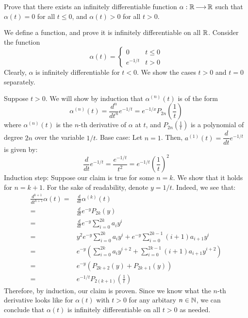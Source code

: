 \newpage
\label{q4}
\begin{qu}[num=4.1]
    Prove that there exists an infinitely differentiable function
    $ \alpha: \mathbb{R} \operatorname{\longrightarrow} \mathbb{R} $ such that $ \alpha(t) = 0 $ for all
    $ t \leq 0 $, and $ \alpha(t) > 0 $ for all $ t > 0 $.
\end{qu}

\begin{soln}
    We define a function, and prove it is infinitely differentiable on all
    $ \mathbb{R} $. Consider the function
    \begin{equation*}
        \alpha(t) = \begin{cases} 0 & t \leq 0 \\ e^{-1/t} & t > 0 \end{cases}
    \end{equation*}
    Clearly, $ \alpha $ is infinitely differentiable for $ t < 0 $.
    We show the cases $ t > 0 $ and $ t = 0 $ separately. \npgh

    Suppose $ t > 0 $. We will show by induction that $ \alpha^{(n)}(t) $ is of
    the form
    \begin{equation*}
        \alpha^{(n)}(t) = \frac{d^{n}}{dt^{n}} e^{-1/t} = e^{-1/x} P_{2n}
        \left( \frac{1}{t} \right)
    \end{equation*}
    where $ \alpha^{(n)}(t) $ is the $ n $-th derivative of $ \alpha $ at $ t $,
    and $ P_{2n}(\frac{1}{t}) $ is a polynomial of degree $ 2n $ over the
    variable $ 1/t $. \vsp
    Base case: Let $ n = 1 $.
    Then, $ a^{(1)}(t) = \dfrac{d}{dt} e^{-1/t} $ is given by:
    \begin{equation*}
        \frac{d}{dt} e^{-1/t} = \frac{e^{-1/t}}{t^{2}} = e^{-1/t}
        \left( \frac{1}{t} \right)^{2}
    \end{equation*}
    Induction step: Suppose our claim is true for some $ n = k $.
    We show that it holds for $ n = k +1 $.
    For the sake of readability, denote $ y = 1/t $. Indeed, we see that:
    \begin{align*}
        \frac{d^{k+1}}{dt^{k+1}} \alpha(t) = & \frac{d}{dt} \alpha^{(k)}(t) \\
                    = & \frac{d}{dt} e^{-y}P_{2k}(y) \\
                    = & \frac{d}{dt} e^{-y}\sum_{i = 0}^{2k} {a_{i}y^{i}} \\
                    = & y^{2} e^{-y} \sum_{i=0}^{2k} {a_{i}y^{i}}
                    + e^{-y} \sum_{i = 0}^{2k-1} {(i+1)a_{i+1}y^{i}} \\
                    = & e^{-y} \left( \sum_{i=0}^{2k} {a_{i}y^{i+2}}
                    + \sum_{i=0}^{2k-1} {(i+1)a_{i+1}y^{i+2}} \right) \\
                    = & e^{-y} \left( P_{2k+2}(y) + P_{2k+1}(y) \right) \\
                    = & e^{-1/t} P_{2(k+1)} \left( \frac{1}{t} \right)
    \end{align*}
    Therefore, by induction, our claim is proven.
    Since we know what the $ n $-th derivative looks like for $ \alpha(t) $ with
    $ t > 0 $ for any arbitary $ n \in \mathbb{N} $, we can conclude that
    $ \alpha(t) $ is infinitely differentiable on all $ t > 0 $ as needed. \npgh
    

\end{soln}
